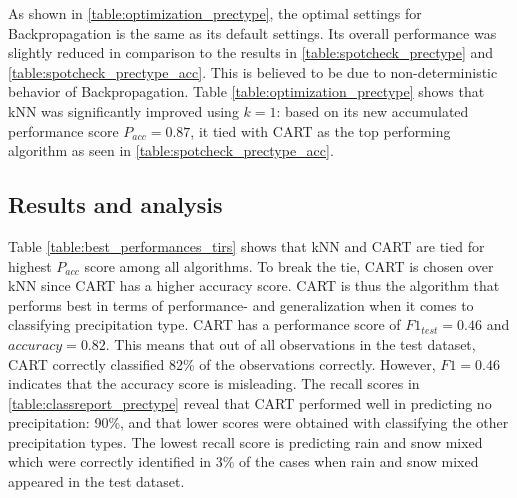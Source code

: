 	As shown in \ref{table:optimization_prectype}, the optimal settings for Backpropagation is the same as its default settings. Its overall performance was slightly reduced in comparison to the results in \ref{table:spotcheck_prectype} and \ref{table:spotcheck_prectype_acc}. This is believed to be due to non-deterministic behavior of Backpropagation. Table \ref{table:optimization_prectype} shows that kNN was significantly improved using $k=1$: based on its new accumulated performance score $P_{acc} = 0.87$, it tied with CART as the top performing algorithm as seen in \ref{table:spotcheck_prectype_acc}.

	\subsection{Results and analysis} \label{sec:results_prectype}

	\begin{table}[H]
		\centering
		\caption{Shows the overall optimal settings and performances for each of the algorithms in classifiying precipitation type.}
	\end{table}

	Table \ref{table:best_performances_tirs} shows that kNN and CART are tied for highest $P_{acc}$ score among all algorithms. To break the tie, CART is chosen over kNN since CART has a higher accuracy score. CART is thus the algorithm that performs best in terms of performance- and generalization when it comes to classifying precipitation type. CART has a performance score of $F1_{test} = 0.46$ and $accuracy = 0.82$. This means that out of all observations in the test dataset, CART correctly classified 82\% of the observations correctly. However, $F1 = 0.46$ indicates that the accuracy score is misleading. The recall scores in \ref{table:classreport_prectype} reveal that CART performed well in predicting no precipitation: 90\%, and that lower scores were obtained with classifying the other precipitation types. The lowest recall score is predicting rain and snow mixed which were correctly identified in 3\% of the cases when rain and snow mixed appeared in the test dataset. 

